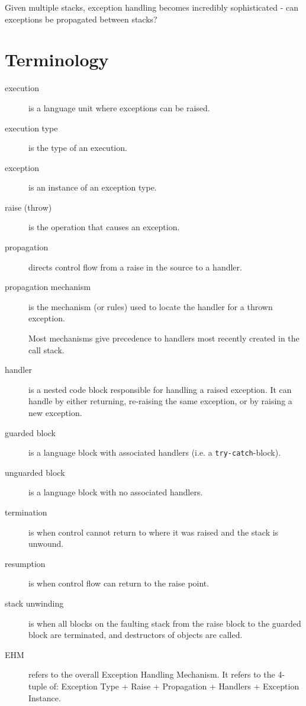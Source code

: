             Given multiple stacks, exception handling becomes incredibly sophisticated - can exceptions be propagated between stacks?

        \section{Terminology} %
        \label{sec:terminology}
            \begin{description}
                \item[execution] is a language unit where exceptions can be raised.
                \item[execution type] is the type of an execution.
                \item[exception] is an instance of an exception type.
                \item[raise (throw)] is the operation that causes an exception.
                \item[propagation] directs control flow from a raise in the source to a handler.
                \item[propagation mechanism] is the mechanism (or rules) used to locate the handler for a thrown exception.

                    Most mechanisms give precedence to handlers most recently created in the call stack.
                \item[handler] is a nested code block responsible for handling a raised exception.
                It can handle by either returning, re-raising the same exception, or by raising a new exception.
                \item[guarded block] is a language block with associated handlers (i.e. a \verb|try-catch|-block).
                \item[unguarded block] is a language block with no associated handlers.
                \item[termination] is when control cannot return to where it was raised and the stack is unwound.
                \item[resumption] is when control flow can return to the raise point.
                \item[stack unwinding] is when all blocks on the faulting stack from the raise block to the guarded block are terminated, and destructors of objects are called.
                \item[EHM] refers to the overall Exception Handling Mechanism.
                It refers to the 4-tuple of:
                Exception Type +
                Raise +
                Propagation +
                Handlers +
                Exception Instance.
            \end{description}
